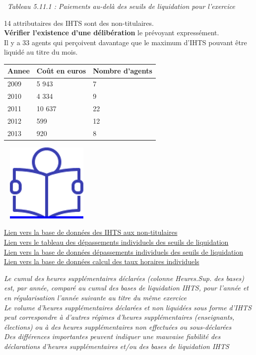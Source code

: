 ~\emph{Tableau 5.11.1 : Paiements au-delà des seuils de liquidation pour
l'exercice}

14 attributaires des IHTS sont des non-titulaires.\\
\textbf{Vérifier l'existence d'une délibération} le prévoyant
expressément.\\
Il y a 33 agents qui perçoivent davantage que le maximum d'IHTS pouvant
être liquidé au titre du mois.

\begin{longtable}[]{@{}lll@{}}
\toprule
Annee & Coût en euros & Nombre d'agents\tabularnewline
\midrule
\endhead
2009 & 5 943 & 7\tabularnewline
2010 & 4 334 & 9\tabularnewline
2011 & 10 637 & 22\tabularnewline
2012 & 599 & 12\tabularnewline
2013 & 920 & 8\tabularnewline
\bottomrule
\end{longtable}

~
\href{../Docs/Notices/fiche_liquidation_IHTS.odt}{\includegraphics{icones/Notice.png}}

\href{../Bases/Reglementation/Base.IHTS.non.tit.csv}{Lien vers la base de
données des IHTS aux non-titulaires}\\
\href{../Bases/Reglementation/depassement.agent.annee.csv}{Lien vers le
tableau des dépassements individuels des seuils de liquidation}\\
\href{../Bases/Reglementation/depassement.agent.csv}{Lien vers la base de
données dépassements individuels des seuils de liquidation}\\
\href{../Bases/Reglementation/Taux.horaires.csv}{Lien vers la base de
données calcul des taux horaires individuels}

\emph{Le cumul des heures supplémentaires déclarées (colonne Heures.Sup.
des bases) est, par année, comparé au cumul des bases de liquidation
IHTS, pour l'année et en régularisation l'année suivante au titre du
même exercice}\\
\emph{Le volume d'heures supplémentaires déclarées et non liquidées sous
forme d'IHTS peut correspondre à d'autres régimes d'heures
supplémentaires (enseignants, élections) ou à des heures supplémentaires
non effectuées ou sous-déclarées}\\
\emph{Des différences importantes peuvent indiquer une mauvaise
fiabilité des déclarations d'heures supplémentaires et/ou des bases de
liquidation IHTS}

